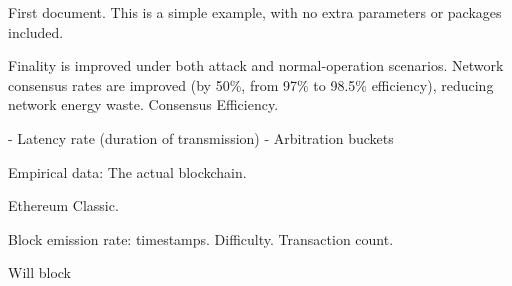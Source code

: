 \documentclass{article}
\begin{document}
First document. This is a simple example, with no 
extra parameters or packages included.


Finality is improved under both attack and normal-operation scenarios.
Network consensus rates are improved (by 50\%, from 97\% to 98.5\% efficiency), reducing network energy waste. Consensus Efficiency.

- Latency rate (duration of transmission)
- Arbitration buckets




	Empirical data:
	The actual blockchain.

	Ethereum Classic.

	Block emission rate: timestamps.
	Difficulty.
	Transaction count.

	Will block
\end{document}
